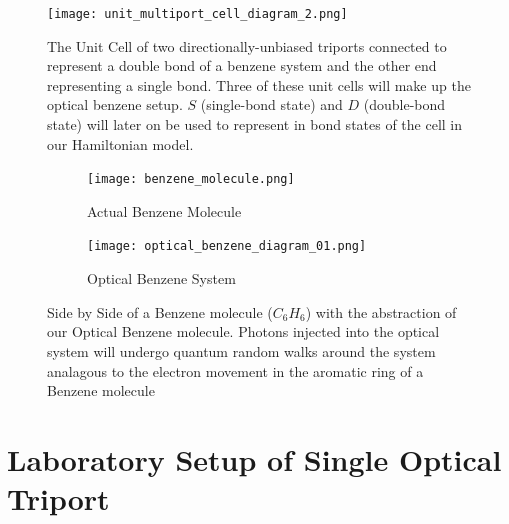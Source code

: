 \begin{figure}[H]
    \centering
    \texttt{[image: unit\_multiport\_cell\_diagram\_2.png]}
    \caption{The Unit Cell of two directionally-unbiased triports connected to represent a double bond of a benzene system and the other end representing a single bond. Three of these unit cells will make up the optical benzene setup. $S$ (single-bond state) and $D$ (double-bond state) will later on be used to represent in bond states of the cell in our Hamiltonian model.}
    \label{fig:my_label}
\end{figure}

\begin{figure}[H]
\centering
\begin{subfigure}{.5\textwidth}
  \centering
  \texttt{[image: benzene\_molecule.png]}
  \caption{Actual Benzene Molecule}
  \label{fig:sub1}
\end{subfigure}%
\begin{subfigure}{.5\textwidth}
  \centering
  \texttt{[image: optical\_benzene\_diagram\_01.png]}
  \caption{Optical Benzene System}
  \label{fig:sub2}
\end{subfigure}
\caption{Side by Side of a Benzene molecule ($C_{6}H_{6}$) with the abstraction of our Optical Benzene molecule. Photons injected into the optical system will undergo quantum random walks around the system analagous to the electron movement in the aromatic ring of a Benzene molecule}
\label{fig:test}
\end{figure}

\newpage
\section{Laboratory Setup of Single Optical Triport}

